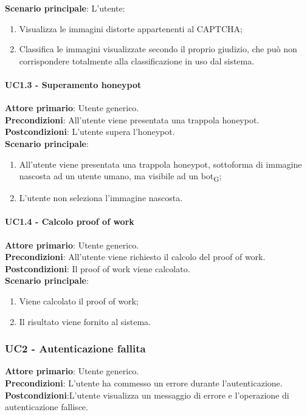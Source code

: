 \textbf{Scenario principale}: L'utente:
\begin{enumerate}
   \item Visualizza le immagini distorte appartenenti al CAPTCHA;
   \item Classifica le immagini visualizzate secondo il proprio giudizio, che può non corrispondere totalmente alla classificazione in uso dal sistema.
\end{enumerate}

\paragraph{UC1.3 - Superamento honeypot}
\textbf{Attore primario}: Utente generico.\\
\textbf{Precondizioni}: All'utente viene presentata una trappola honeypot.\\
\textbf{Postcondizioni}: L'utente supera l'honeypot.\\

\textbf{Scenario principale}:
\begin{enumerate}
   \item All'utente viene presentata una trappola honeypot, sottoforma di immagine nascosta ad un utente umano, ma visibile ad un bot\textsubscript{G};
   \item L'utente non seleziona l'immagine nascosta.
\end{enumerate}

\paragraph{UC1.4 - Calcolo proof of work}
\textbf{Attore primario}: Utente generico.\\
\textbf{Precondizioni}: All'utente viene richiesto il calcolo del proof of work.\\
\textbf{Postcondizioni}: Il proof of work viene calcolato.\\

\textbf{Scenario principale}:
\begin{enumerate}
   \item Viene calcolato il proof of work;
   \item Il risultato viene fornito al sistema.
\end{enumerate}

\subsubsection{UC2 - Autenticazione fallita}
\textbf{Attore primario}: Utente generico.\\
\textbf{Precondizioni}: L’utente ha commesso un errore durante l'autenticazione.\\
\textbf{Postcondizioni}:L’utente visualizza un messaggio di errore e l’operazione di autenticazione fallisce.\\


